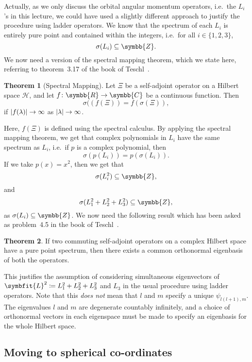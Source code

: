 \documentclass[12pt, a4 paper]{article}
\let\symcal\mathcal
\theoremstyle{definition}
\newtheorem{thm}{Theorem}
\newcommand{\rr}{\symbb{R}}
\newcommand{\cc}{\symbb{C}}
\newcommand{\zz}{\symbb{Z}}
\newcommand{\hilbert}{\symcal{H}}
\newcommand{\spec}{\sigma}
\DeclarePairedDelimiter{\abs}{\lvert}{\rvert}
\begin{document}
    Actually, as we only discuss the orbital angular momentum operators, i.e.\ the \(L_i\)'s in this lecture, we could have used a slightly different approach to justify the procedure using ladder operators. We know that the spectrum of each \(L_i\) is entirely pure point and contained within the integers, i.e.\ for all \(i \in \{1, 2, 3\}\),
    \[
        \spec(L_i) \subseteq \zz.
    \]
    We now need a version of the spectral mapping theorem, which we state here, referring to theorem~3.17 of the book of Teschl~\cite[p.~118]{Teschl}.
    \begin{thm}[Spectral Mapping]
        Let \(\Xi\) be a self-adjoint operator on a Hilbert space \(\hilbert\), and let \(f \colon \rr \rightarrow \cc\) be a continuous function. Then
        \[
            \spec((f(\Xi)) = f(\spec(\Xi)),
        \]
        if \(\abs{f(\lambda)} \rightarrow \infty\) as \(\abs{\lambda} \rightarrow \infty\).
    \end{thm}
    Here, \(f(\Xi)\) is defined using the spectral calculus. By applying the spectral mapping theorem, we get that complex polynomials in \(L_i\) have the same spectrum as \(L_i\), i.e.\ if \(p\) is a complex polynomial, then
    \[
        \spec(p(L_i)) = p(\spec(L_i)).
    \]
    If we take \(p(x) = x^2\), then we get that \[\spec(L_i^2) \subseteq \zz,\] and \[\spec(L_1^2 + L_2^2 + L_3^2) \subseteq \zz,\] as \(\spec(L_i) \subseteq \zz\). We now need the following result which has been asked as problem~4.5 in the book of Teschl~\cite[p.~138]{Teschl}.
    \begin{thm}
        If two commuting self-adjoint operators on a complex Hilbert space have a pure point spectrum, then there exists a common orthonormal eigenbasis of both the operators.
    \end{thm}
    This justifies the assumption of considering simultaneous eigenvectors of \(\symbfit{L}^2 \coloneq L_1^2 + L_2^2 + L_3^2\) and \(L_3\) in the usual procedure using ladder operators. Note that this \textit{does not} mean that \(l\) and \(m\) specify a unique \(\psi_{l(l+1), m}\). The eigenvalues \(l\) and \(m\) are degenerate countably infinitely, and a choice of orthonormal vectors in each eigenspace must be made to specify an eigenbasis for the whole Hilbert space.

    \subsection{Moving to spherical co-ordinates}
\end{document}
